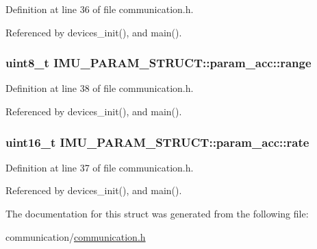 Definition at line 36 of file communication.h.



Referenced by devices\_\-init(), and main().

\hypertarget{structIMU__PARAM__STRUCT_1_1param__acc_a26199b298ef2d353192dfbc706bce8cf}{
\subsubsection[{range}]{\setlength{\rightskip}{0pt plus 5cm}uint8\_\-t {\bf IMU\_\-PARAM\_\-STRUCT::param\_\-acc::range}}}
\label{structIMU__PARAM__STRUCT_1_1param__acc_a26199b298ef2d353192dfbc706bce8cf}


Definition at line 38 of file communication.h.



Referenced by devices\_\-init(), and main().

\hypertarget{structIMU__PARAM__STRUCT_1_1param__acc_a30e6a318cad098cd8379416705820f95}{
\subsubsection[{rate}]{\setlength{\rightskip}{0pt plus 5cm}uint16\_\-t {\bf IMU\_\-PARAM\_\-STRUCT::param\_\-acc::rate}}}
\label{structIMU__PARAM__STRUCT_1_1param__acc_a30e6a318cad098cd8379416705820f95}


Definition at line 37 of file communication.h.



Referenced by devices\_\-init(), and main().



The documentation for this struct was generated from the following file:\begin{DoxyCompactItemize}
\item 
communication/\hyperlink{communication_8h}{communication.h}\end{DoxyCompactItemize}
